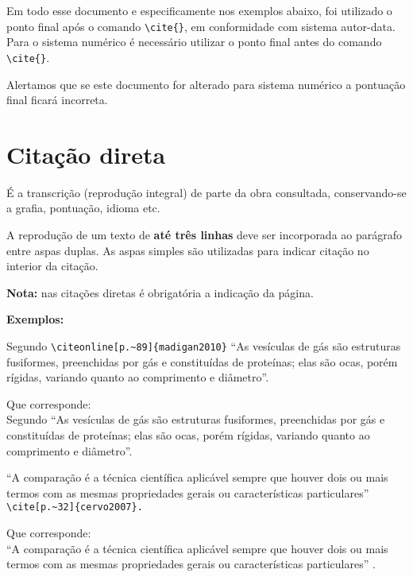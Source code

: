 Em todo esse documento e especificamente nos exemplos abaixo, foi utilizado o ponto final após o comando \verb+\cite{}+, em conformidade com sistema autor-data. Para o sistema numérico é necessário utilizar o ponto final antes do comando \verb+\cite{}+. 

Alertamos que se este documento for alterado para sistema numérico a pontuação final ficará incorreta. 

\section{Citação direta}

É a transcrição (reprodução integral) de parte da obra consultada, conservando-se a grafia, pontuação, idioma etc.

A reprodução de um texto de \textbf{até três linhas} deve ser incorporada ao parágrafo entre aspas duplas. As aspas simples são utilizadas para indicar citação no interior da citação.

\textbf{Nota:} nas citações diretas é obrigatória a indicação da página.

\textbf{Exemplos: }

\begin{alineas} 
\item 

Segundo \verb+\citeonline[p.~89]{madigan2010}+ “As vesículas de gás são estruturas fusiformes, preenchidas por gás e constituídas de proteínas; elas são ocas, porém rígidas, variando quanto ao comprimento e diâmetro”.

Que corresponde: \\
Segundo  “As vesículas de gás são estruturas
fusiformes, preenchidas por gás e constituídas de proteínas; elas são ocas, porém
rígidas, variando quanto ao comprimento e diâmetro”.

\item 

“A comparação é a técnica científica aplicável sempre que houver dois ou
mais termos com as mesmas propriedades gerais ou características particulares”  \verb+\cite[p.~32]{cervo2007}.+

Que corresponde: \\
“A comparação é a técnica científica aplicável sempre que houver dois ou
mais termos com as mesmas propriedades gerais ou características particulares” \cite[p.~32]{cervo2007}.

\end{alineas}

